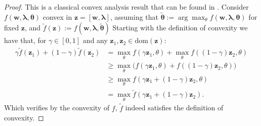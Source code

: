 \begin{lemma}
    \label{lemma:ftilde_is_convex}
    \begin{proof}
        This is a classical convex analysis result that can be found in \cite{boyd2004convex}. Consider $f(\bm{w},\bm{\lambda},\bm{\theta})$ convex in $\bm{z} = [\bm{w},\bm{\lambda}]$, assuming that $\tilde{\bm{\theta}} := \arg \max_{\theta} f(\bm{w},\bm{\lambda},\bm{\theta})$ for fixed $\bm{z}$, and $\tilde{f}(\bm{z}):=f(\bm{w},\bm{\lambda},\tilde{\bm{\theta}})$ Starting with the definition of convexity we have that, for $\gamma\in[0,1]$ and any $\bm{z}_1,\bm{z}_2 \in \text{dom}(\bm{z})$:
        \begin{align*}
            \gamma \tilde{f}(\bm{z}_1) + (1-\gamma) \tilde{f}(\bm{z}_2) 
            & =
            \max_\theta {f}( \gamma \bm{z}_1,\theta) + \max_\theta {f}(  (1-\gamma) \bm{z}_2, \theta ) \\
            & \geq
            \max_\theta \Big( {f}( \gamma \bm{z}_1,\theta)  + {f}(  (1-\gamma) \bm{z}_2, \theta )  \Big)\\
            & \geq
            \max_\theta {f}( \gamma \bm{z}_1 + (1-\gamma) \bm{z}_2, \theta ) \\
            & =
            \max_\theta \tilde{f}( \gamma \bm{z}_1 + (1-\gamma) \bm{z}_2) .
        \end{align*}
        Which verifies by the convexity of $f$, $\tilde{f}$ indeed satisfies the definition of convexity.
    \end{proof}
\end{lemma}